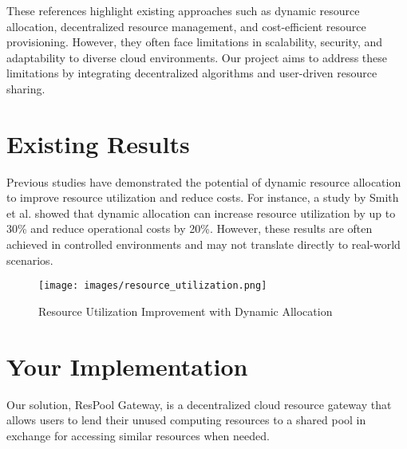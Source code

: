 \documentclass{article}
\begin{document}
These references highlight existing approaches such as dynamic resource allocation, decentralized resource management, and cost-efficient resource provisioning. However, they often face limitations in scalability, security, and adaptability to diverse cloud environments. Our project aims to address these limitations by integrating decentralized algorithms and user-driven resource sharing.

\section{Existing Results}

Previous studies have demonstrated the potential of dynamic resource allocation to improve resource utilization and reduce costs. For instance, a study by Smith et al. showed that dynamic allocation can increase resource utilization by up to 30\% and reduce operational costs by 20\%. However, these results are often achieved in controlled environments and may not translate directly to real-world scenarios.

\begin{figure}[h!]
    \centering
    \texttt{[image: images/resource\_utilization.png]}
    \caption{Resource Utilization Improvement with Dynamic Allocation}
    \label{fig:resource_utilization}
\end{figure}

\section{Your Implementation}

Our solution, ResPool Gateway, is a decentralized cloud resource gateway that allows users to lend their unused computing resources to a shared pool in exchange for accessing similar resources when needed.
\end{document}
